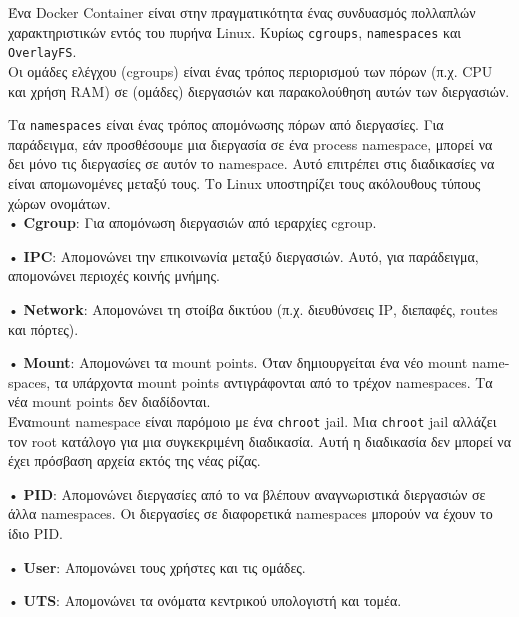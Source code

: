 Ένα \textlatin{Docker Container} είναι στην πραγματικότητα ένας συνδυασμός
πολλαπλών χαρακτηριστικών εντός του πυρήνα \textlatin{Linux}. Κυρίως 
\texttt{\textlatin{cgroups}}, \texttt{\textlatin{namespaces}} και 
\texttt{\textlatin{OverlayFS}}. \\

Οι ομάδες ελέγχου (\textlatin{cgroups}) είναι ένας τρόπος περιορισμού των
πόρων (π.χ. \textlatin{CPU} και χρήση \textlatin{RAM}) σε (ομάδες) διεργασιών
και παρακολούθηση αυτών των διεργασιών.

Τα \texttt{\textlatin{namespaces}} είναι ένας τρόπος απομόνωσης πόρων από
διεργασίες. Για παράδειγμα, εάν προσθέσουμε μια διεργασία σε ένα
\textlatin{process namespace}, μπορεί να δει μόνο τις διεργασίες
σε αυτόν το \textlatin{namespace}. Αυτό επιτρέπει στις διαδικασίες να είναι
απομωνομένες μεταξύ τους. Το \textlatin{Linux} υποστηρίζει τους ακόλουθους
τύπους χώρων ονομάτων. \\

• \textbf{\textlatin{Cgroup}}: Για απομόνωση διεργασιών από ιεραρχίες
\textlatin{cgroup}.

• \textbf{\textlatin{IPC}}: Απομονώνει την επικοινωνία μεταξύ διεργασιών.
Αυτό, για παράδειγμα, απομονώνει περιοχές κοινής μνήμης.

• \textbf{\textlatin{Network}}: Απομονώνει τη στοίβα δικτύου (π.χ. διευθύνσεις
\textlatin{IP}, διεπαφές, \textlatin{routes} και πόρτες).

• \textbf{\textlatin{Mount}}: Απομονώνει τα \textlatin{mount points}. Όταν
δημιουργείται ένα νέο \textlatin{mount namespaces}, τα υπάρχοντα
\textlatin{mount points} αντιγράφονται από το τρέχον \textlatin{namespaces}.
Τα νέα \textlatin{mount points} δεν διαδίδονται. \\

Ένα\textlatin{mount namespace} είναι παρόμοιο με ένα
\textlatin{\texttt{chroot} jail}. Μια \textlatin{\texttt{chroot} jail}
αλλάζει τον \textlatin{root} κατάλογο για μια συγκεκριμένη διαδικασία.
Αυτή η διαδικασία δεν μπορεί να έχει πρόσβαση αρχεία εκτός της νέας ρίζας.

• \textbf{\textlatin{PID}}: Απομονώνει διεργασίες από το να βλέπουν
αναγνωριστικά διεργασιών σε άλλα \textlatin{namespaces}.
Οι διεργασίες σε διαφορετικά \textlatin{namespaces} μπορούν να έχουν το ίδιο
\textlatin{PID}.

• \textbf{\textlatin{User}}: Απομονώνει τους χρήστες και τις ομάδες.

• \textbf{\textlatin{UTS}}: Απομονώνει τα ονόματα κεντρικού υπολογιστή και
τομέα. \\


